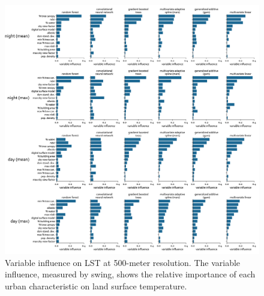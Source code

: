 \documentclass[final,3p,times,twocolumn,sort&compress]{elsarticle}
\begin{document}
\begin{figure}[h]
    \begin{center}
    \includegraphics[width=\linewidth]{fig/report/importance_500.png}
    \caption[Variable influence on LST at 500-meter resolution]{
    Variable influence on LST at 500-meter resolution.
    The variable influence, measured by swing, shows the relative importance of each urban characteristic on land surface temperature.}
    \label{fig:importance_500}
    \end{center}
\end{figure}
\end{document}
